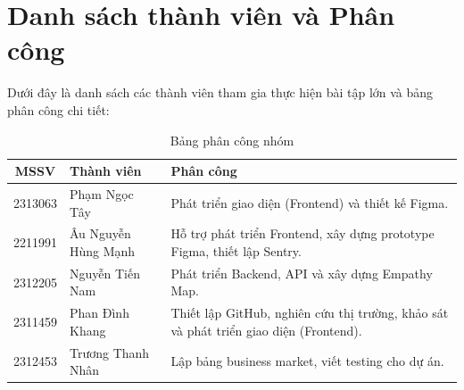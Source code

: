 \section*{Danh sách thành viên và Phân công}

Dưới đây là danh sách các thành viên tham gia thực hiện bài tập lớn và bảng phân công chi tiết:

\begin{table}[htbp]
    \centering
    \renewcommand{\arraystretch}{1.5} %
    \begin{tabular}{|c|l|p{8cm}|}
        \hline
        \textbf{MSSV} & \textbf{Thành viên} & \textbf{Phân công} \\ \hline
        2313063 & Phạm Ngọc Tây & Phát triển giao diện (Frontend) và thiết kế Figma. \\ \hline
        2211991 & Âu Nguyễn Hùng Mạnh & Hỗ trợ phát triển Frontend, xây dựng prototype Figma, thiết lập Sentry. \\ \hline
        2312205 & Nguyễn Tiến Nam & Phát triển Backend, API và xây dựng Empathy Map. \\ \hline
        2311459 & Phan Đình Khang & Thiết lập GitHub, nghiên cứu thị trường, khảo sát và phát triển giao diện (Frontend). \\ \hline
        2312453 & Trương Thanh Nhân & Lập bảng business market, viết testing cho dự án. \\ \hline
    \end{tabular}
    \caption{Bảng phân công nhóm}
    \label{tab:member_contribution}
\end{table}

\newpage
